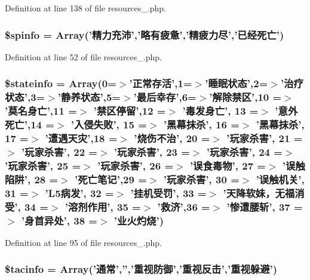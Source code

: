 Definition at line 138 of file resources\+\_.\+php.

\hypertarget{resources__1_8php_a79b3890cc1a3fac35858fb155b285743}{
\subsubsection[{\$spinfo}]{\setlength{\rightskip}{0pt plus 5cm}\$spinfo = Array('精力充沛','略有疲惫','精疲力尽','已经死亡')}}\label{resources__1_8php_a79b3890cc1a3fac35858fb155b285743}


Definition at line 52 of file resources\+\_.\+php.

\hypertarget{resources__1_8php_a014f40ed69f3ce2bd7a3263f5b5c9d91}{
\subsubsection[{\$stateinfo}]{\setlength{\rightskip}{0pt plus 5cm}\$stateinfo = Array(0=$>$'正常存活',1=$>$'睡眠状态',2=$>$'治疗状态',3=$>$'静养状态',5=$>$'最后幸存',6=$>$'解除禁区',10 =$>$ '莫名身亡',11 =$>$ '禁区停留',12 =$>$ '毒发身亡', 13 =$>$ '意外死亡',14 =$>$ '入侵失败', 15 =$>$ '黑幕抹杀', 16 =$>$ '黑幕抹杀', 17 =$>$ '遭遇天灾',18 =$>$ '烧伤不治', 20 =$>$ '玩家杀害', 21 =$>$ '玩家杀害', 22 =$>$ '玩家杀害', 23 =$>$ '玩家杀害', 24 =$>$ '玩家杀害', 25 =$>$ '玩家杀害', 26 =$>$ '误食毒物', 27 =$>$ '误触陷阱', 28 =$>$ '死亡笔记',29 =$>$ '玩家杀害', 30 =$>$ '误触机关', 31 =$>$ 'L5病发', 32 =$>$ '挂机受罚', 33 =$>$ '天降软妹，无福消受', 34 =$>$ '溶剂作用', 35 =$>$ '救济',36 =$>$ '惨遭腰斩', 37 =$>$ '身首异处', 38 =$>$ '业火灼烧')}}\label{resources__1_8php_a014f40ed69f3ce2bd7a3263f5b5c9d91}


Definition at line 95 of file resources\+\_.\+php.

\hypertarget{resources__1_8php_aed45c4ff2bc7ce0af6c4b05414cd1373}{
\subsubsection[{\$tacinfo}]{\setlength{\rightskip}{0pt plus 5cm}\$tacinfo = Array('通常','','重视防御','重视反击','重视躲避')}}\label{resources__1_8php_aed45c4ff2bc7ce0af6c4b05414cd1373}


